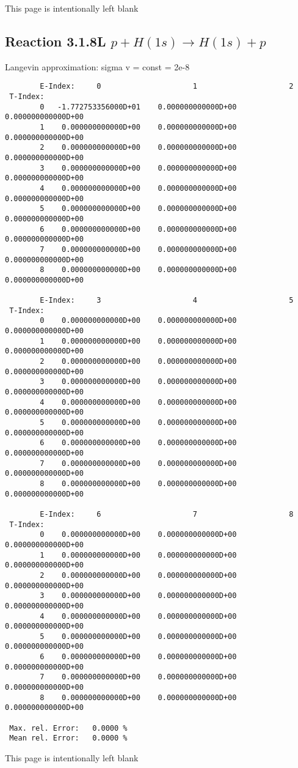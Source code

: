 \documentclass[12pt,dvipdfmx]{article}
\begin{document}
\newpage
This page is intentionally left blank
\newpage


\subsection{
Reaction 3.1.8L $ p + H(1s) \rightarrow H(1s) + p   $
}

 Langevin approximation: sigma v = const = 2e-8


\begin{small}\begin{verbatim}
        E-Index:     0                     1                     2
 T-Index:
        0   -1.772753356000D+01    0.000000000000D+00    0.000000000000D+00
        1    0.000000000000D+00    0.000000000000D+00    0.000000000000D+00
        2    0.000000000000D+00    0.000000000000D+00    0.000000000000D+00
        3    0.000000000000D+00    0.000000000000D+00    0.000000000000D+00
        4    0.000000000000D+00    0.000000000000D+00    0.000000000000D+00
        5    0.000000000000D+00    0.000000000000D+00    0.000000000000D+00
        6    0.000000000000D+00    0.000000000000D+00    0.000000000000D+00
        7    0.000000000000D+00    0.000000000000D+00    0.000000000000D+00
        8    0.000000000000D+00    0.000000000000D+00    0.000000000000D+00

        E-Index:     3                     4                     5
 T-Index:
        0    0.000000000000D+00    0.000000000000D+00    0.000000000000D+00
        1    0.000000000000D+00    0.000000000000D+00    0.000000000000D+00
        2    0.000000000000D+00    0.000000000000D+00    0.000000000000D+00
        3    0.000000000000D+00    0.000000000000D+00    0.000000000000D+00
        4    0.000000000000D+00    0.000000000000D+00    0.000000000000D+00
        5    0.000000000000D+00    0.000000000000D+00    0.000000000000D+00
        6    0.000000000000D+00    0.000000000000D+00    0.000000000000D+00
        7    0.000000000000D+00    0.000000000000D+00    0.000000000000D+00
        8    0.000000000000D+00    0.000000000000D+00    0.000000000000D+00

        E-Index:     6                     7                     8
 T-Index:
        0    0.000000000000D+00    0.000000000000D+00    0.000000000000D+00
        1    0.000000000000D+00    0.000000000000D+00    0.000000000000D+00
        2    0.000000000000D+00    0.000000000000D+00    0.000000000000D+00
        3    0.000000000000D+00    0.000000000000D+00    0.000000000000D+00
        4    0.000000000000D+00    0.000000000000D+00    0.000000000000D+00
        5    0.000000000000D+00    0.000000000000D+00    0.000000000000D+00
        6    0.000000000000D+00    0.000000000000D+00    0.000000000000D+00
        7    0.000000000000D+00    0.000000000000D+00    0.000000000000D+00
        8    0.000000000000D+00    0.000000000000D+00    0.000000000000D+00

 Max. rel. Error:   0.0000 %
 Mean rel. Error:   0.0000 %

\end{verbatim}\end{small}
\newpage
This page is intentionally left blank
\newpage
\end{document}
